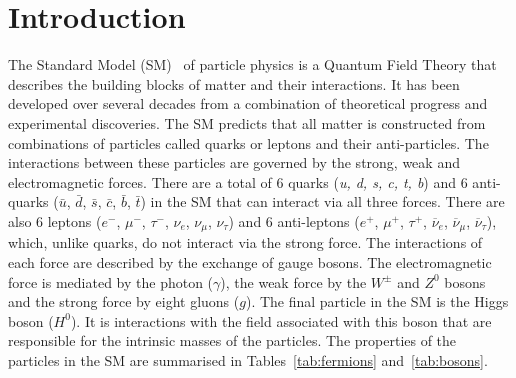 \chapter{{\bf Introduction}}
\label{sec:intro}


The Standard Model (SM)~\cite{GLASHOW1961579,PhysRevLett.19.1264,PhysRevD.2.1285} of particle physics is a Quantum Field Theory that describes the building blocks of matter and their interactions. It has been developed over several decades from a combination of theoretical progress and experimental discoveries. 
The SM predicts that all matter is constructed from combinations of particles called quarks or leptons and their anti-particles. The interactions between these particles are governed by the strong, weak and electromagnetic forces. 
There are a total of 6 quarks ({\it u, d, s, c, t, b}) and 6 anti-quarks ($\bar{u}$, $\bar{d}$, $\bar{s}$, $\bar{c}$, $\bar{b}$, $\bar{t}$) in the SM that can interact via all three forces. There are also 6 leptons ($e^{-}$, $\mu^{-}$, $\tau^{-}$, $\nu_e$, $\nu_{\mu}$, $\nu_{\tau}$) and 6 anti-leptons ($e^{+}$, $\mu^{+}$, $\tau^{+}$, $\overline{\nu}_e$, $\overline{\nu}_{\mu}$, $\overline{\nu}_{\tau}$), which, unlike quarks, do not interact via the strong force.
The interactions of each force are described by the exchange of gauge bosons. The electromagnetic force is mediated by the photon ($\gamma$), the weak force by the $W^{\pm}$ and $Z^0$ bosons and the strong force by eight gluons ($g$). 
The final particle in the SM is the Higgs boson ($H^0$). It is interactions with the field associated with this boson that are responsible for the intrinsic masses of the particles. The properties of the particles in the SM are summarised in Tables~\ref{tab:fermions} and~\ref{tab:bosons}.

